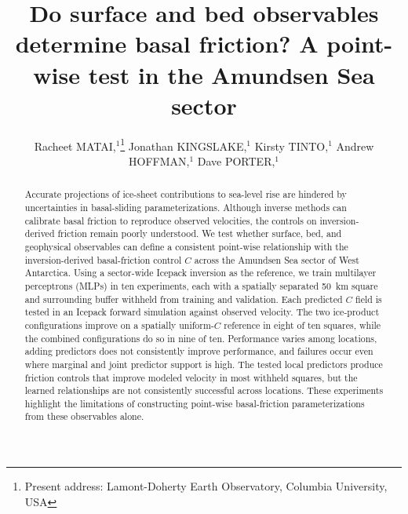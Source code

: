 \documentclass[review,jog]{igs}
\begin{document}
\def\FinalPass{1}

\title[Testing point-wise inference of basal friction]{Do surface and bed observables determine basal friction? A point-wise test in the Amundsen Sea sector}

\author[Matai and others]{Racheet MATAI,$^1$\protect\thanks{Present address:
  Lamont-Doherty Earth Observatory, Columbia University, USA}
  Jonathan KINGSLAKE,$^1$ Kirsty TINTO,$^1$ Andrew HOFFMAN,$^1$ Dave PORTER,$^1$}


\begin{frontmatter}
\maketitle
\begin{abstract}
Accurate projections of ice-sheet contributions to sea-level rise are hindered by uncertainties in basal-sliding parameterizations. Although inverse methods can calibrate basal friction to reproduce observed velocities, the controls on inversion-derived friction remain poorly understood. We test whether surface, bed, and geophysical observables can define a consistent point-wise relationship with the inversion-derived basal-friction control $C$ across the Amundsen Sea sector of West Antarctica. Using a sector-wide Icepack inversion as the reference, we train multilayer perceptrons (MLPs) in ten experiments, each with a spatially separated 50~km square and surrounding buffer withheld from training and validation. Each predicted $C$ field is tested in an Icepack forward simulation against observed velocity. The two ice-product configurations improve on a spatially uniform-$C$ reference in eight of ten squares, while the combined configurations do so in nine of ten. Performance varies among locations, adding predictors does not consistently improve performance, and failures occur even where marginal and joint predictor support is high. The tested local predictors produce friction controls that improve modeled velocity in most withheld squares, but the learned relationships are not consistently successful across locations. These experiments highlight the limitations of constructing point-wise basal-friction parameterizations from these observables alone.
\end{abstract}
\end{frontmatter}
\end{document}
